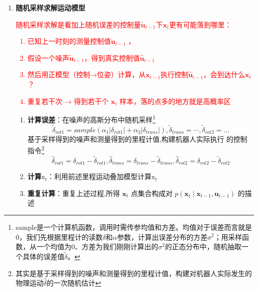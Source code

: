 \documentclass[../main.tex]{subfiles}
\begin{document}
\begin{enumerate}
\begin{enumerate}
        \item \textbf{随机采样求解运动模型}\\
            {\small\kaishu \textcolor{red}{随机采样求解是看加上随机误差的控制量$\widetilde{\mathbf{u}}_{t-1}$下$ \mathbf{x}_t $更有可能落到哪里：
            \begin{enumerate}
                \item 已知上一时刻的测量控制值$\mathbf{u}_{t-1}$ ，
                \item 假设一个噪声$\widetilde{\mathbf{u}}_{t-1}$，得到真实控制值$\widehat{\mathbf{u}}_{t-1}$
                \item 然后用正模型（控制→位姿）计算，从$\mathbf{x}_{t-1}$执行控制$\widehat{\mathbf{u}}_{t-1}$，会到达什么$\mathbf{x}_{t}$？
                \item 重复若干次 → 得到若干个 $ \mathbf{x}_t $ 样本，落的点多的地方就是高概率区
            \end{enumerate}
            }}
            \begin{enumerate}
                \item \textbf{计算误差}：在噪声的高斯分布中随机采样\footnote{sample是一个计算机函数，调用时需传参均值和方差。均值对于误差而言就是0，我们先根据里程计的读数$\delta$和$\alpha$参数，计算出误差分布的方差$\sigma^2$；用采样函数，从一个均值为0、方差为我们刚刚计算出的$\sigma^2$的正态分布中，随机抽取一个具体的误差值$\widetilde{\delta }$。}
                $${\widetilde{\delta }}_{rot1} = {sample}\left( {{\alpha }_{1}\left| {\delta }_{rot1}\right|  + {\alpha }_{2}\left| {\delta }_{trans}\right| }\right) ,{\widetilde{\delta }}_{trans} = \cdots ,{\widetilde{\delta }}_{rot2} = ... $$
                基于采样得到的噪声和测量得到的里程计值,构建机器人实际执行
                的控制指令\footnote{其实是基于采样得到的噪声和测量得到的里程计值，构建对机器人实际发生的物理运动$\widehat{\delta }$的一次随机估计}
                $$ {\widehat{\delta }}_{rot1} = {\delta }_{rot1} - {\widetilde{\delta }}_{rot1},{\widehat{\delta }}_{trans} = {\delta }_{trans} - {\widetilde{\delta }}_{trans},{\widehat{\delta }}_{rot2} = {\delta }_{rot2} - {\widetilde{\delta }}_{rot2} $$    
                \item \textbf{计算$\mathrm{x}_t$}：利用前述里程运动叠加模型计算$\mathrm{x}_t$
                \item \textbf{重复计算}：重复上述过程,所得 \( {\mathbf{x}}_{t} \) 点集合构成对 \( p\left( {{\mathbf{x}}_{t} \mid  {\mathbf{x}}_{t - 1},{\mathbf{u}}_{t - 1}}\right) \) 的描述
            \end{enumerate}

\end{enumerate}
\end{enumerate}
\end{document}
